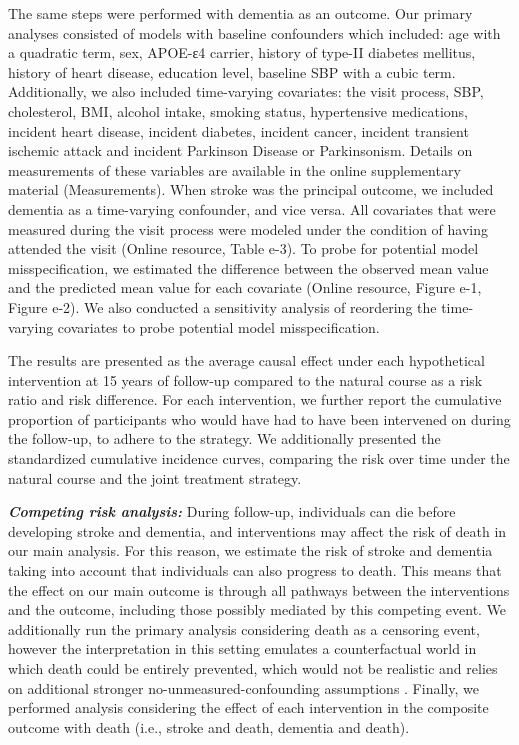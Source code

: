 \documentclass[
]{book}
\begin{document}
The same steps were performed with dementia as an outcome. Our primary analyses consisted of models with baseline confounders which included: age with a quadratic term, sex, APOE-ε4 carrier, history of type-II diabetes mellitus, history of heart disease, education level, baseline SBP with a cubic term. Additionally, we also included time-varying covariates: the visit process, SBP, cholesterol, BMI, alcohol intake, smoking status, hypertensive medications, incident heart disease, incident diabetes, incident cancer, incident transient ischemic attack and incident Parkinson Disease or Parkinsonism. Details on measurements of these variables are available in the online supplementary material (Measurements). When stroke was the principal outcome, we included dementia as a time-varying confounder, and vice versa. All covariates that were measured during the visit process were modeled under the condition of having attended the visit (Online resource, Table e-3). To probe for potential model misspecification, we estimated the difference between the observed mean value and the predicted mean value for each covariate (Online resource, Figure e-1, Figure e-2). We also conducted a sensitivity analysis of reordering the time-varying covariates to probe potential model misspecification.

The results are presented as the average causal effect under each hypothetical intervention at 15 years of follow-up compared to the natural course as a risk ratio and risk difference. For each intervention, we further report the cumulative proportion of participants who would have had to have been intervened on during the follow-up, to adhere to the strategy. We additionally presented the standardized cumulative incidence curves, comparing the risk over time under the natural course and the joint treatment strategy.

\textbf{\emph{Competing risk analysis:}} During follow-up, individuals can die before developing stroke and dementia, and interventions may affect the risk of death in our main analysis. For this reason, we estimate the risk of stroke and dementia taking into account that individuals can also progress to death. This means that the effect on our main outcome is through all pathways between the interventions and the outcome, including those possibly mediated by this competing event. We additionally run the primary analysis considering death as a censoring event, however the interpretation in this setting emulates a counterfactual world in which death could be entirely prevented, which would not be realistic and relies on additional stronger no-unmeasured-confounding assumptions \autocite{young2020}. Finally, we performed analysis considering the effect of each intervention in the composite outcome with death (i.e., stroke and death, dementia and death).
\end{document}
